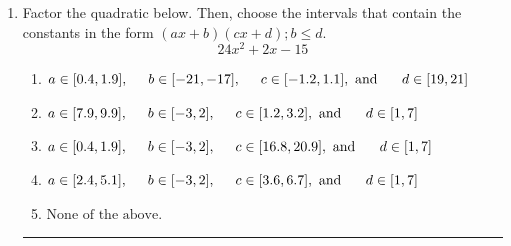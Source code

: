 \documentclass[14pt]{extbook}
\newcommand{\litem}[1]{\item#1\hspace*{-1cm}\rule{\textwidth}{0.4pt}}
\begin{document}
\begin{enumerate}
{\begin{enumerate}[label=\Alph*.]
\end{enumerate} }
\litem{
Factor the quadratic below. Then, choose the intervals that contain the constants in the form $(ax+b)(cx+d); b \leq d.$\[ 24x^{2} +2 x -15 \]\begin{enumerate}[label=\Alph*.]
\item \( a \in [0.4, 1.9], \hspace*{5mm} b \in [-21, -17], \hspace*{5mm} c \in [-1.2, 1.1], \text{ and } \hspace*{5mm} d \in [19, 21] \)
\item \( a \in [7.9, 9.9], \hspace*{5mm} b \in [-3, 2], \hspace*{5mm} c \in [1.2, 3.2], \text{ and } \hspace*{5mm} d \in [1, 7] \)
\item \( a \in [0.4, 1.9], \hspace*{5mm} b \in [-3, 2], \hspace*{5mm} c \in [16.8, 20.9], \text{ and } \hspace*{5mm} d \in [1, 7] \)
\item \( a \in [2.4, 5.1], \hspace*{5mm} b \in [-3, 2], \hspace*{5mm} c \in [3.6, 6.7], \text{ and } \hspace*{5mm} d \in [1, 7] \)
\item \( \text{None of the above.} \)


\end{enumerate}}
\end{enumerate}
\end{document}
